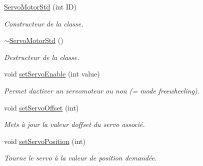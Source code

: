 \begin{DoxyCompactItemize}
\item 
\mbox{\label{classServoMotorStd_a8eddb416fb7421b67370778f0e085ff9}} 
\hyperlink{classServoMotorStd_a8eddb416fb7421b67370778f0e085ff9}{Servo\+Motor\+Std} (int ID)
\begin{DoxyCompactList}\small\item\em Constructeur de la classe. \end{DoxyCompactList}\item 
\mbox{\label{classServoMotorStd_aa774c78bc09e922fa1120d4940614b36}} 
\hyperlink{classServoMotorStd_aa774c78bc09e922fa1120d4940614b36}{$\sim$\+Servo\+Motor\+Std} ()
\begin{DoxyCompactList}\small\item\em Destructeur de la classe. \end{DoxyCompactList}\item 
void \hyperlink{classServoMotorStd_a680ab8eb08df76e4da18255a55c6110d}{set\+Servo\+Enable} (int value)
\begin{DoxyCompactList}\small\item\em Permet d\textquotesingle{}activer un servomoteur ou non (= mode freewheeling). \end{DoxyCompactList}\item 
\mbox{\label{classServoMotorStd_a79e1d54582a2c4b03efd6ea8d4a2b951}} 
void \hyperlink{classServoMotorStd_a79e1d54582a2c4b03efd6ea8d4a2b951}{set\+Servo\+Offset} (int)
\begin{DoxyCompactList}\small\item\em Mets à jour la valeur d\textquotesingle{}offset du servo associé. \end{DoxyCompactList}\item 
\mbox{\label{classServoMotorStd_aaa80293c0fed06bf725387a9dc49fd8f}} 
void \hyperlink{classServoMotorStd_aaa80293c0fed06bf725387a9dc49fd8f}{set\+Servo\+Position} (int)
\begin{DoxyCompactList}\small\item\em Tourne le servo à la valeur de position demandée. \end{DoxyCompactList}\item 
\mbox{\label{classServoMotorStd_a4aa6332476150562db280920882b65ba}} 

\end{DoxyCompactItemize}
